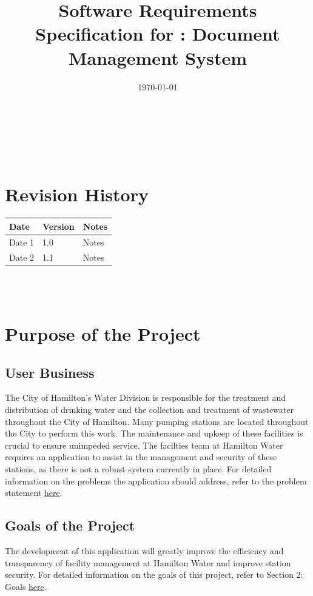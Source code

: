 \documentclass[12pt]{article}
\begin{document}
\title{Software Requirements Specification for \progname: Document
Management System}
\author{\authname}
\date{\today}

\maketitle

~\newpage


\tableofcontents

~\newpage

\section*{Revision History}

\begin{tabularx}{\textwidth}{p{3cm}p{2cm}X}
  \toprule {\textbf{Date}} & {\textbf{Version}} & {\textbf{Notes}}\\
  \midrule
  Date 1 & 1.0 & Notes\\
  Date 2 & 1.1 & Notes\\
  \bottomrule
\end{tabularx}

~\\

~\newpage
\section{Purpose of the Project}
\subsection{User Business}
The City of Hamilton's Water Division is responsible for the
treatment and distribution of drinking water and the collection and
treatment of wastewater throughout the City of Hamilton. Many pumping
stations are located throughout the City to perform this work. The
maintenance and upkeep of these facilities is crucial to ensure
unimpeded service. The facilties team at Hamilton Water requires an
application to assist in the management and security of these
stations, as there is not a robust system currently in place. For
detailed information on the problems the application should address,
refer to the problem statement
\href{https://github.com/Spitgranger/capstone/blob/main/docs/ProblemStatementAndGoals/ProblemStatement.pdf}{here}.
\subsection{Goals of the Project}
The development of this application will greatly improve the
efficiency and transparency of facility management at Hamilton Water
and improve station security. For detailed information on the goals
of this project, refer to Section 2: Goals
\href{https://github.com/Spitgranger/capstone/blob/main/docs/ProblemStatementAndGoals/ProblemStatement.pdf}{here}.
\end{document}
